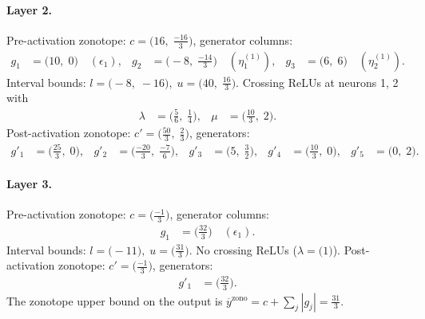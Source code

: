 \documentclass[11pt]{article}
\begin{document}
\paragraph{Layer 2.}
Pre-activation zonotope: $c = \bigl(16,\; \frac{-16}{3}\bigr)$, generator columns:
\begin{align*}
g_{1} &= \bigl(10,\; 0\bigr) \quad (\epsilon_{1}), &
g_{2} &= \bigl(-8,\; \frac{-14}{3}\bigr) \quad (\eta^{(1)}_{1}), &
g_{3} &= \bigl(6,\; 6\bigr) \quad (\eta^{(1)}_{2}).
\end{align*}
Interval bounds: $l = \bigl(-8,\; -16\bigr), \; u = \bigl(40,\; \frac{16}{3}\bigr)$. 
Crossing ReLUs at neurons 1, 2 with
\begin{align*}
\lambda &= \bigl(\frac{5}{6},\; \frac{1}{4}\bigr), & \mu &= \bigl(\frac{10}{3},\; 2\bigr).
\end{align*}
Post-activation zonotope: $c' = \bigl(\frac{50}{3},\; \frac{2}{3}\bigr)$, generators:
\begin{align*}
g'_{1} &= \bigl(\frac{25}{3},\; 0\bigr), &
g'_{2} &= \bigl(\frac{-20}{3},\; \frac{-7}{6}\bigr), &
g'_{3} &= \bigl(5,\; \frac{3}{2}\bigr), &
g'_{4} &= \bigl(\frac{10}{3},\; 0\bigr), &
g'_{5} &= \bigl(0,\; 2\bigr).
\end{align*}
\paragraph{Layer 3.}
Pre-activation zonotope: $c = \bigl(\frac{-1}{3}\bigr)$, generator columns:
\begin{align*}
g_{1} &= \bigl(\frac{32}{3}\bigr) \quad (\epsilon_{1}).
\end{align*}
Interval bounds: $l = \bigl(-11\bigr), \; u = \bigl(\frac{31}{3}\bigr)$. 
No crossing ReLUs ($\lambda = \bigl(1\bigr)$).
Post-activation zonotope: $c' = \bigl(\frac{-1}{3}\bigr)$, generators:
\begin{align*}
g'_{1} &= \bigl(\frac{32}{3}\bigr).
\end{align*}
The zonotope upper bound on the output is $\overline{y}^{\text{zono}} = c + \sum_j |g_j| = \frac{31}{3}$.
\end{document}
